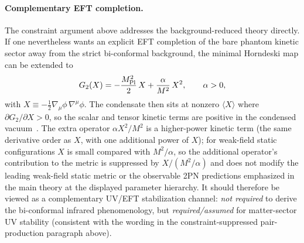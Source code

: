 \documentclass[11pt]{article}
\begin{document}
\paragraph{Complementary EFT completion.}
The constraint argument above addresses the background-reduced
theory directly.  If one nevertheless wants an explicit EFT
completion of the bare phantom kinetic sector away from the
strict bi-conformal background, the minimal Horndeski map can
be extended to
\begin{equation}
G_2(X)= -\frac{M_{\rm Pl}^{2}}{2}\,X
  + \frac{\alpha}{M^{2}}\,X^{2},
\qquad
\alpha>0,
\end{equation}
with $X\equiv -\frac12\nabla_\mu\phi\,\nabla^\mu\phi$.
The condensate then sits at nonzero $\langle X\rangle$ where
$\partial G_2/\partial X>0$, so the scalar and tensor kinetic
terms are positive in the condensed vacuum~\cite{ArkaniHamed2004}.
The extra operator $\alpha X^{2}/M^{2}$ is a higher-power
kinetic term (the same derivative order as $X$, with one
additional power of $X$); for weak-field static configurations
$X$ is small compared with $M^{2}/\alpha$, so the additional
operator's contribution to the metric is suppressed by
$X/(M^{2}/\alpha)$ and does not modify the leading weak-field
static metric or the observable 2PN predictions emphasized in
the main theory at the displayed parameter hierarchy.  It should
therefore be viewed as a complementary UV/EFT stabilization
channel: \emph{not required} to derive the bi-conformal infrared
phenomenology, but \emph{required/assumed} for matter-sector
UV stability (consistent with the wording in the
constraint-suppressed pair-production paragraph above).
\end{document}

